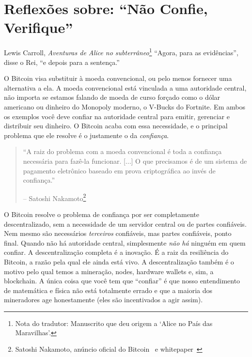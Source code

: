 \chapter{Reflexões sobre: \enquote{Não Confie, Verifique}}
\label{les:16}

\begin{chapquote}{Lewis Carroll, \textit{Aventuras de Alice no subterrâneo}\footnote{Nota do tradutor: Manuscrito que deu origem a `Alice no País das Maravilhas'.}}
\enquote{Agora, para as evidências}, disse o Rei, \enquote{e depois para a sentença.}
\end{chapquote}

O Bitcoin visa substituir à moeda convencional, ou pelo menos fornecer uma alternativa a ela. A moeda convencional está vinculada a uma autoridade central, não importa se estamos falando de moeda de curso forçado como o dólar americano ou dinheiro do Monopoly moderno, o V-Bucks do Fortnite. Em ambos os exemplos você deve confiar na autoridade central para emitir, gerenciar e distribuir seu dinheiro. O Bitcoin acaba com essa necessidade, e o principal problema que ele resolve é o justamente o da \textit{confiança}.

\begin{quotation}\begin{samepage}
\enquote{A raiz do problema com a moeda convencional é toda a confiança necessária para fazê-la funcionar. [...] O que precisamos é de um sistema de pagamento eletrônico baseado em prova criptográfica ao invés de confiança.}
\begin{flushright} -- Satoshi Nakamoto\footnote{Satoshi Nakamoto, anúncio oficial do Bitcoin~\cite{bitcoin-announcement} e whitepaper~\cite{whitepaper}}
\end{flushright}\end{samepage}\end{quotation}

O Bitcoin resolve o problema de confiança por ser completamente descentralizado, sem a necessidade de um servidor central ou de partes confiáveis. Nem mesmo são necessários \textit{terceiros} confiáveis, mas partes confiáveis, ponto final. Quando não há autoridade central, simplesmente \textit{não há}  ninguém em quem confiar. A descentralização completa é a inovação. É a raiz da resiliência do Bitcoin, a razão pela qual ele ainda está vivo. A descentralização também é o motivo pelo qual temos a mineração, nodes, hardware wallets e, sim, a blockchain. A única coisa que você tem que \enquote{confiar} é que nosso entendimento de matemática e física não está totalmente errado e que a maioria dos mineradores age honestamente (eles são incentivados a agir assim).


